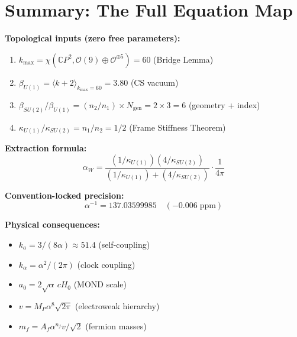 \documentclass[11pt]{article}
\begin{document}
\section{Summary: The Full Equation Map}

\begin{tcolorbox}[colback=blue!5!white, colframe=blue!50!black, title=Complete $\alpha$ Equation Inventory]

\textbf{Topological inputs (zero free parameters):}
\begin{enumerate}
\item $k_{\max} = \chi(\mathbb{C}P^2, \mathcal{O}(9) \oplus \mathcal{O}^{\oplus 5}) = 60$ \quad (Bridge Lemma)
\item $\beta_{U(1)} = \langle k+2\rangle_{k_{\max}=60} = 3.80$ \quad (CS vacuum)
\item $\beta_{SU(2)}/\beta_{U(1)} = (n_2/n_1) \times N_{\mathrm{gen}} = 2 \times 3 = 6$ \quad (geometry + index)
\item $\kappa_{U(1)}/\kappa_{SU(2)} = n_1/n_2 = 1/2$ \quad (Frame Stiffness Theorem)
\end{enumerate}

\textbf{Extraction formula:}
\begin{equation*}
\alpha_W = \frac{(1/\kappa_{U(1)})(4/\kappa_{SU(2)})}{(1/\kappa_{U(1)}) + (4/\kappa_{SU(2)})} \cdot \frac{1}{4\pi}
\end{equation*}

\textbf{Convention-locked precision:}
\begin{equation*}
\alpha^{-1} = 137.03599985 \quad (-0.006\;\text{ppm})
\end{equation*}

\textbf{Physical consequences:}
\begin{itemize}
\item $k_a = 3/(8\alpha) \approx 51.4$ \quad (self-coupling)
\item $k_\alpha = \alpha^2/(2\pi)$ \quad (clock coupling)
\item $a_0 = 2\sqrt{\alpha}\,cH_0$ \quad (MOND scale)
\item $v = M_P \alpha^8 \sqrt{2\pi}$ \quad (electroweak hierarchy)
\item $m_f = A_f \alpha^{n_f} v/\sqrt{2}$ \quad (fermion masses)
\end{itemize}
\end{tcolorbox}
\end{document}
